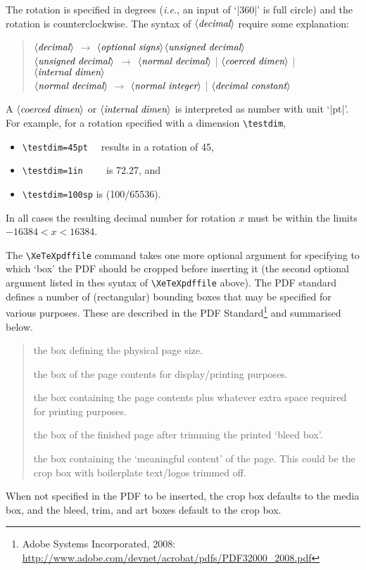 \documentclass[12pt]{article}
\edef\|{|}
\newcommand\xarg[1]{$\langle\hbox{\rmfamily\itshape #1}\rangle$}
\def\<#1>{\xarg{#1}}
\def\cs#1{\texttt{\textbackslash#1}}
\let\latin\textit
\def\ie{\latin{i.e.}}
\begin{document}
The rotation is specified in degrees (\ie, an input of ‘|360|’ is full
circle) and the rotation is counterclockwise. The syntax of
\xarg{decimal} require some explanation:
\begin{quote}
\<decimal> $\to$ \<optional signs>\<unsigned decimal>\\
\<unsigned decimal> $\to$ \<normal decimal>
  \| \<coerced dimen> \| \<internal dimen>\\
\<normal decimal> $\to$ \<normal integer> \| \<decimal constant>
\end{quote}
A \xarg{coerced dimen} or \xarg{internal dimen} is interpreted as number
with unit ‘|pt|’. For example, for a rotation specified with a dimension
\cs{testdim},
\begin{itemize}
\item \verb|\testdim=45pt  | results in a rotation of 45\textdegree,
\item \verb|\testdim=1in    | is 72.27\textdegree, and
\item \verb|\testdim=100sp| is (100/65536)\textdegree.
\end{itemize}
In all cases the resulting decimal number for rotation $x$ must be  
within the limits $-16384 < x < 16384$.

The \cs{XeTeXpdffile} command takes one more optional argument for
specifying to which ‘box’ the PDF should be cropped before inserting
it (the second optional argument listed in thes syntax of
\cs{XeTeXpdffile} above). The PDF standard defines a number of
(rectangular) bounding boxes that may be specified for various
purposes. These are described in the PDF Standard\footnote{Adobe
Systems Incorporated, 2008:\\
\url{http://www.adobe.com/devnet/acrobat/pdfs/PDF32000_2008.pdf}} and
summarised below.
\begin{quote}
\begin{description}[style=nextline,leftmargin=1.5cm]
\item [media] the box defining the physical page size.
\item [crop] the box of the page contents for display/printing purposes.
\item [bleed] the box containing the page contents plus whatever extra
space required for printing purposes.
\item [trim] the box of the finished page after trimming the printed
‘bleed box’.
\item [art] the box containing the ‘meaningful content’ of the
page. This could be the crop box with boilerplate text/logos trimmed
off.
\end{description}
\end{quote}
When not specified in the PDF to be inserted, the crop box defaults
to the media box, and the bleed, trim, and art boxes default to the crop
box.
\end{document}
